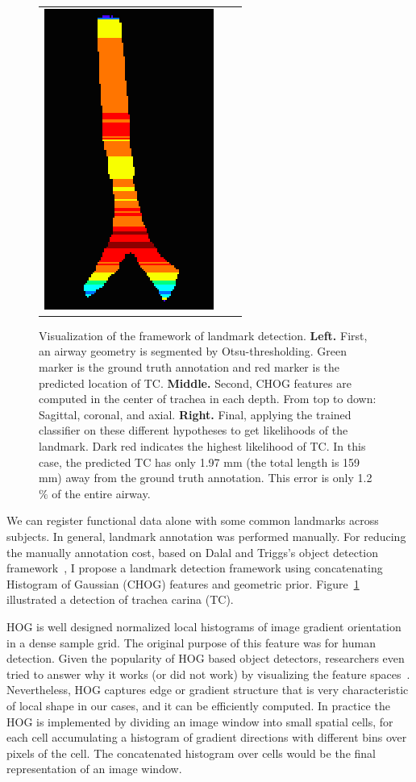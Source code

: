 \begin{figure}[tb]
\begin{center}
\begin{tabular}{ccc}
    \includegraphics[height=\figheight] {fig/Fleck_005_likelihood.png}
    \end{tabular}
    \caption{ \label{fig:detection} Visualization of the framework of landmark detection. {\bf Left.} First, an airway geometry is segmented by Otsu-thresholding. Green marker is the ground truth annotation and red marker is the predicted location of TC. {\bf Middle.} Second, CHOG features are computed in the center of trachea in each depth. From top to down: Sagittal, coronal, and axial. {\bf Right.} Final, applying the trained classifier on these different hypotheses to get likelihoods of the landmark. Dark red indicates the highest likelihood of TC. In this case, the predicted TC has only 1.97 mm (the total length is 159 mm) away from the ground truth annotation. This error is only 1.2$\%$ of the entire airway.
    }
  \end{center}
\end{figure}

We can register functional data alone with some common landmarks across subjects.
In general, landmark annotation was performed manually.
For reducing the manually annotation cost, based on Dalal and Triggs's object detection framework~\cite{dalal2005histograms}, I propose a landmark detection framework using concatenating Histogram of Gaussian (CHOG) features and geometric prior. Figure~\ref{fig:detection} illustrated a detection of trachea carina (TC).

HOG is well designed normalized local histograms of image gradient orientation in a dense sample grid.
The original purpose of this feature was for human detection.
Given the popularity of HOG based object detectors, researchers even tried to answer why it works (or did not work) by visualizing the feature spaces~\cite{vondrick2013hoggles}.
Nevertheless, HOG captures edge or gradient structure that is very characteristic of local shape in our cases, and it can be efficiently computed.
In practice the HOG is implemented by dividing an image window into small spatial cells, for each cell accumulating a histogram of gradient directions with different bins over pixels of the cell.
The concatenated histogram over cells would be the final representation of an image window.

